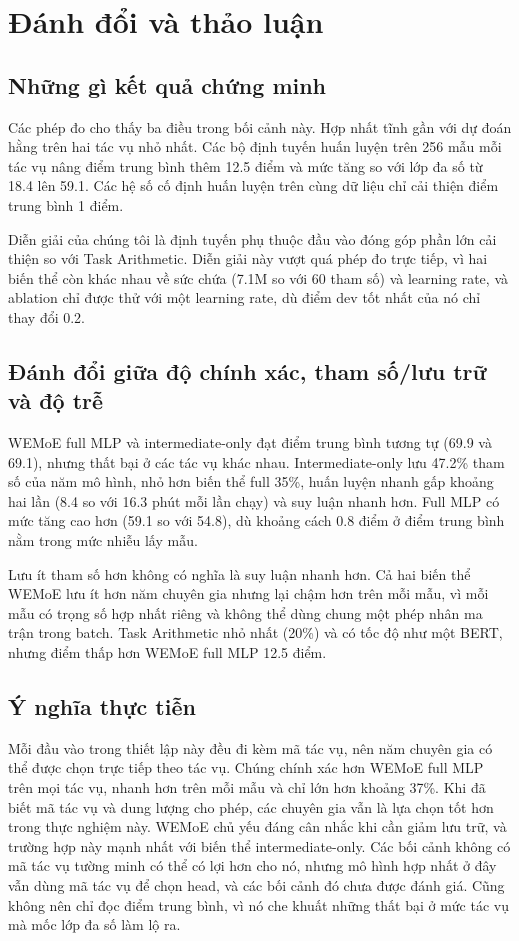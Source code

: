 \chapter{Đánh đổi và thảo luận}
\label{ch:discussion}

\section{Những gì kết quả chứng minh}

Các phép đo cho thấy ba điều trong bối cảnh này. Hợp nhất tĩnh gần với dự đoán hằng trên hai tác vụ nhỏ nhất. Các bộ định tuyến huấn luyện trên 256 mẫu mỗi tác vụ nâng điểm trung bình thêm 12.5 điểm và mức tăng so với lớp đa số từ 18.4 lên 59.1. Các hệ số cố định huấn luyện trên cùng dữ liệu chỉ cải thiện điểm trung bình 1 điểm.

Diễn giải của chúng tôi là định tuyến phụ thuộc đầu vào đóng góp phần lớn cải thiện so với Task Arithmetic. Diễn giải này vượt quá phép đo trực tiếp, vì hai biến thể còn khác nhau về sức chứa (7.1M so với 60 tham số) và learning rate, và ablation chỉ được thử với một learning rate, dù điểm dev tốt nhất của nó chỉ thay đổi 0.2.

\section{Đánh đổi giữa độ chính xác, tham số/lưu trữ và độ trễ}

WEMoE full MLP và intermediate-only đạt điểm trung bình tương tự (69.9 và 69.1), nhưng thất bại ở các tác vụ khác nhau. Intermediate-only lưu 47.2\% tham số của năm mô hình, nhỏ hơn biến thể full 35\%, huấn luyện nhanh gấp khoảng hai lần (8.4 so với 16.3 phút mỗi lần chạy) và suy luận nhanh hơn. Full MLP có mức tăng cao hơn (59.1 so với 54.8), dù khoảng cách 0.8 điểm ở điểm trung bình nằm trong mức nhiễu lấy mẫu.

Lưu ít tham số hơn không có nghĩa là suy luận nhanh hơn. Cả hai biến thể WEMoE lưu ít hơn năm chuyên gia nhưng lại chậm hơn trên mỗi mẫu, vì mỗi mẫu có trọng số hợp nhất riêng và không thể dùng chung một phép nhân ma trận trong batch. Task Arithmetic nhỏ nhất (20\%) và có tốc độ như một BERT, nhưng điểm thấp hơn WEMoE full MLP 12.5 điểm.

\section{Ý nghĩa thực tiễn}

Mỗi đầu vào trong thiết lập này đều đi kèm mã tác vụ, nên năm chuyên gia có thể được chọn trực tiếp theo tác vụ. Chúng chính xác hơn WEMoE full MLP trên mọi tác vụ, nhanh hơn trên mỗi mẫu và chỉ lớn hơn khoảng 37\%. Khi đã biết mã tác vụ và dung lượng cho phép, các chuyên gia vẫn là lựa chọn tốt hơn trong thực nghiệm này. WEMoE chủ yếu đáng cân nhắc khi cần giảm lưu trữ, và trường hợp này mạnh nhất với biến thể intermediate-only. Các bối cảnh không có mã tác vụ tường minh có thể có lợi hơn cho nó, nhưng mô hình hợp nhất ở đây vẫn dùng mã tác vụ để chọn head, và các bối cảnh đó chưa được đánh giá. Cũng không nên chỉ đọc điểm trung bình, vì nó che khuất những thất bại ở mức tác vụ mà mốc lớp đa số làm lộ ra.

